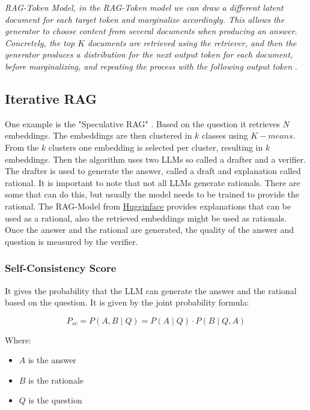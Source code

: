 \documentclass{wseas}
\begin{document}
\emph{RAG-Token Model, in the RAG-Token model we can draw a different
latent document for each target token and marginalize accordingly. This
allows the generator to choose content from several documents when
producing an answer. Concretely, the top $K$ documents are retrieved using
the retriever, and then the generator produces a distribution for the
next output token for each document, before marginalizing, and repeating
the process with the following output token}
\cite{Retrieval_Augmented_Generation_(RAG)_Explained_Understanding_Key_Concepts}.

\subsection{Iterative RAG}

One example is the "Speculative RAG" \cite{SpeculativeRAG_EnhancingRetrieval-AugmentedGenerationThroughDrafting}. 
Based on the question it retrieves \(N\) embeddings.
The embeddings are then clustered in \(k\) classes using $K-means$. From the
\(k\) clusters one embedding is selected per cluster, resulting in $k$
embeddings. Then the algorithm uses two LLMs so called a drafter and a
verifier. The drafter is used to generate the answer, called a draft and
explanation called rational. It is important to note that not all LLMs
generate rationals. There are some that can do this, but usually the
model needs to be trained to provide the rational. The RAG-Model from
\href{https://huggingface.co/}{Hugginface} provides explanations that 
can be used as a rational, also the retrieved embeddings might be used 
as rationals. Once the answer and the rational are generated, the quality 
of the answer and question is measured by the verifier.

\subsubsection{Self-Consistency Score}

It gives the probability that the LLM can generate the answer and the
rational based on the question. It is given by the joint probability
formula:

\begin{equation}
  P_{sc} = P(A,B \mid Q) = P(A \mid Q) \cdot P(B \mid Q, A)
  \label{eq:self_consistency_score}
\end{equation}
  
Where:
\begin{itemize}
  \item \( A \) is the answer
  \item \( B \) is the rationale
  \item \( Q \) is the question
\end{itemize}
\end{document}

